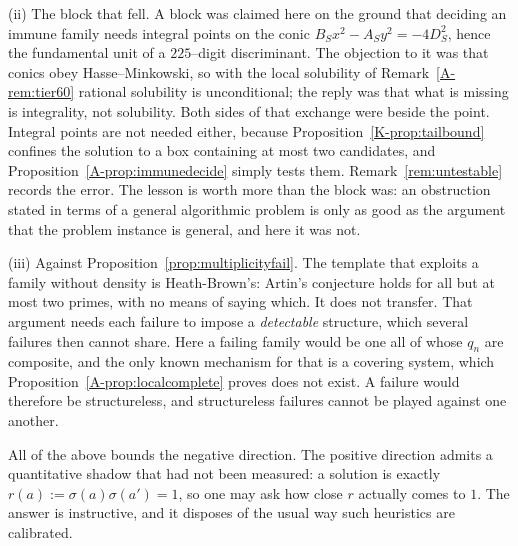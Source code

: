 \documentclass[11pt]{article}
\theoremstyle{definition}
\begin{document}
\textup{(ii) The block that fell.} A block was claimed here on the ground that deciding an immune
family needs integral points on the conic $B_Sx^2-A_Sy^2=-4D_S^2$, hence the fundamental unit of a
$225$--digit discriminant. The objection to it was that conics obey Hasse--Minkowski, so with the
local solubility of Remark~\ref{A-rem:tier60} rational solubility is unconditional; the reply was that
what is missing is integrality, not solubility. Both sides of that exchange were beside the point.
Integral points are not needed either, because Proposition~\ref{K-prop:tailbound} confines the solution
to a box containing at most two candidates, and Proposition~\ref{A-prop:immunedecide} simply tests
them. Remark~\ref{rem:untestable} records the error. The lesson is worth more than the block was: an
obstruction stated in terms of a general algorithmic problem is only as good as the argument that the
problem instance is general, and here it was not.

\textup{(iii) Against Proposition~\ref{prop:multiplicityfail}.} The template that exploits a family
without density is Heath-Brown's: Artin's conjecture holds for all but at most two primes, with no
means of saying which. It does not transfer. That argument needs each failure to impose a
\emph{detectable} structure, which several failures then cannot share. Here a failing family would
be one all of whose $q_n$ are composite, and the only known mechanism for that is a covering system,
which Proposition~\ref{A-prop:localcomplete} proves does not exist. A failure would therefore be
structureless, and structureless failures cannot be played against one another.


All of the above bounds the negative direction. The positive direction admits a quantitative
shadow that had not been measured: a solution is exactly $r(a):=\sigma(a)\sigma(a')=1$, so one may
ask how close $r$ actually comes to $1$. The answer is instructive, and it disposes of the usual
way such heuristics are calibrated.
\end{document}

